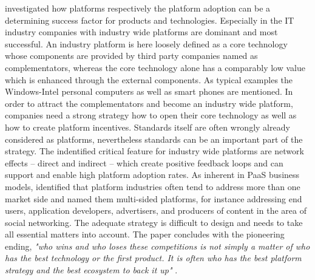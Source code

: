 \citet{Cusumano2010} investigated how platforms respectively the platform adoption can be a determining success factor for products and technologies. Especially in the \ac{IT} industry companies with industry wide platforms are dominant and most successful. An industry platform is here loosely defined as a core technology whose components are provided by third party companies named as complementators, whereas the core technology alone has a comparably low value which is enhanced through the external components. As typical examples the Windows-Intel personal computers as well as smart phones are mentioned. In order to attract the complementators and become an industry wide platform, companies need a strong strategy how to open their core technology as well as how to create platform incentives. Standards itself are often wrongly already considered as platforms, nevertheless standards can be an important part of the strategy. The indentified critical feature for industry wide platforms are network effects -- direct and indirect -- which create positive feedback loops and can support and enable high platform adoption rates. As inherent in \ac{PaaS} business models, \citet{Cusumano2010} identified that platform industries often tend to address more than one market side and named them multi-sided platforms, for instance addressing end users, application developers, advertisers, and producers of content in the area of social networking. The adequate strategy is difficult to design and needs to take all essential matters into account. The paper concludes with the pioneering ending, \textit{"who wins and who loses these competitions is not simply a matter of who has the best technology or the first product. It is often who has the best platform strategy and the best ecosystem to back it up"} \citep[p. 34]{Cusumano2010}.

